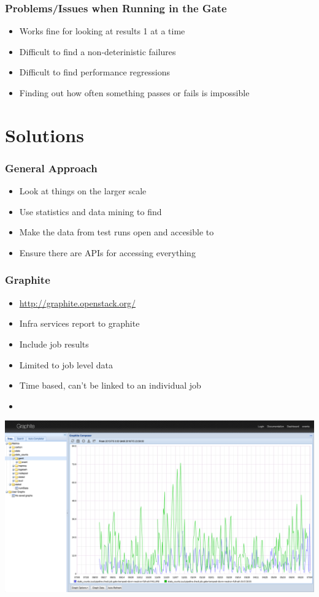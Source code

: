 \documentclass[aspectratio=43,11pt,hyperref={colorlinks=true}]{beamer}
\begin{document}
\begin{frame}
  \frametitle{Problems/Issues when Running in the Gate}
  \begin{itemize}
    \item Works fine for looking at results 1 at a time
    \item Difficult to find a non-deterinistic failures
    \item Difficult to find performance regressions
    \item Finding out how often something passes or fails is impossible
  \end{itemize}
\end{frame}

\section{Solutions}
\begin{frame}
  \frametitle{General Approach}
    \begin{itemize}
        \item Look at things on the larger scale
        \item Use statistics and data mining to find
        \item Make the data from test runs open and accesible to
        \item Ensure there are APIs for accessing everything
    \end{itemize}
\end{frame}

\begin{frame}
  \frametitle{Graphite}
  \begin{itemize}
    \item \href{http://graphite.openstack.org/}{http://graphite.openstack.org/}
    \item Infra services report to graphite
    \item Include job results
    \item Limited to job level data
    \item Time based, can't be linked to an individual job
    \item
  \end{itemize}
  \begin{center}
    \includegraphics[width=.65\textwidth]{graphite-sample.png}
  \end{center}
\end{frame}
\end{document}
